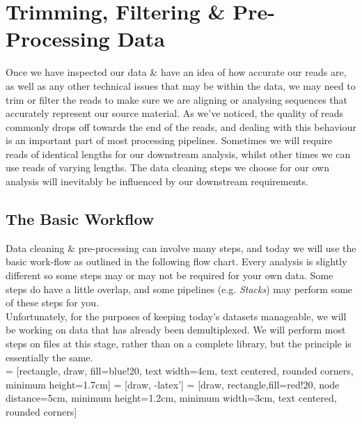 \chapter{Trimming, Filtering \& Pre-Processing Data}


Once we have inspected our data \& have an idea of how accurate our reads are, as well as any other technical issues that may be within the data, we may need to trim or filter the reads to make sure we are aligning or analysing sequences that accurately represent our source material.
As we've noticed, the quality of reads commonly drops off towards the end of the reads, and dealing with this behaviour is an important part of most processing pipelines.
Sometimes we will require reads of identical lengths for our downstream analysis, whilst other times we can use reads of varying lengths.
The data cleaning steps we choose for our own analysis will inevitably be influenced by our downstream requirements.

\section{The Basic Workflow}

Data cleaning \& pre-processing can involve many steps, and today we will use the basic work-flow as outlined in the following flow chart.
Every analysis is slightly different so some steps may or may not be required for your own data.
Some steps do have a little overlap, and some pipelines (e.g. \textit{Stacks}) may perform some of these steps for you.\\

Unfortunately, for the purposes of keeping today's datasets manageable, we will be working on data that has already been demultiplexed.
We will perform most steps on files at this stage, rather than on a complete library, but the principle is essentially the same.\\

 = [rectangle, draw, fill=blue!20,  text width=4cm, text centered, rounded corners, minimum height=1.7cm]
 = [draw, -latex']
 = [draw, rectangle,fill=red!20, node distance=5cm, minimum height=1.2cm, minimum width=3cm,  text centered, rounded corners]

